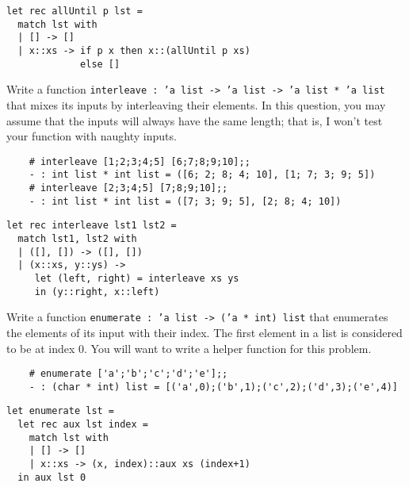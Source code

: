 \documentclass[addpoints]{exam}
\begin{document}
\begin{questions}
  \begin{solutionbox}{3.5cm}
    \begin{verbatim}
let rec allUntil p lst =
  match lst with
  | [] -> []
  | x::xs -> if p x then x::(allUntil p xs)
             else []
    \end{verbatim}
  \end{solutionbox}

  
  \question
  Write a function 
  \texttt{interleave : 'a list -> 'a list -> 'a list * 'a list} 
  that mixes its inputs by interleaving their elements.
  In this question, you may assume that the inputs will always have the same length;
  that is, I won't test your function with naughty inputs.
  \begin{verbatim}
    # interleave [1;2;3;4;5] [6;7;8;9;10];;                                   
    - : int list * int list = ([6; 2; 8; 4; 10], [1; 7; 3; 9; 5])
    # interleave [2;3;4;5] [7;8;9;10];;    
    - : int list * int list = ([7; 3; 9; 5], [2; 8; 4; 10])
  \end{verbatim}

  \begin{solutionbox}{4cm}
    \begin{verbatim}
let rec interleave lst1 lst2 =
  match lst1, lst2 with
  | ([], []) -> ([], [])
  | (x::xs, y::ys) ->
     let (left, right) = interleave xs ys
     in (y::right, x::left)
    \end{verbatim}
  \end{solutionbox}

  
  \question
  Write a function 
  \texttt{enumerate : 'a list -> ('a * int) list} 
  that enumerates the elements of its input with their index.
  The first element in a list is considered to be at index 0.
  You will want to write a helper function for this problem.
  \begin{verbatim}
    # enumerate ['a';'b';'c';'d';'e'];;
    - : (char * int) list = [('a',0);('b',1);('c',2);('d',3);('e',4)]
  \end{verbatim}

  \begin{solutionbox}{4cm}
    \begin{verbatim}
let enumerate lst =
  let rec aux lst index =
    match lst with
    | [] -> []
    | x::xs -> (x, index)::aux xs (index+1)
  in aux lst 0
    \end{verbatim}
  \end{solutionbox}

  
  \vspace{1em}
  \vspace{1em}


\end{questions}
\end{document}
